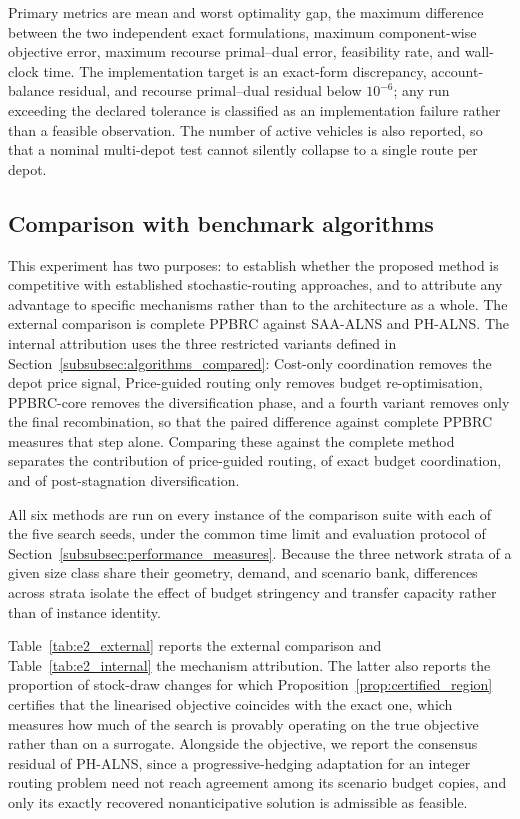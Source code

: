 \documentclass[authoryear,final,3p,times]{elsarticle}
\theoremstyle{definition}
\theoremstyle{plain}
\begin{document}
Primary metrics are mean and worst optimality gap, the maximum difference between the two independent exact formulations, maximum component-wise objective error, maximum recourse primal--dual error, feasibility rate, and wall-clock time. The implementation target is an exact-form discrepancy, account-balance residual, and recourse primal--dual residual below $10^{-6}$; any run exceeding the declared tolerance is classified as an implementation failure rather than a feasible observation.  The number of active vehicles is also reported, so that a nominal multi-depot test cannot silently collapse to a single route per depot.

\subsection{Comparison with benchmark algorithms}
\label{subsec:e2_algorithm}

This experiment has two purposes: to establish whether the proposed method is
competitive with established stochastic-routing approaches, and to attribute
any advantage to specific mechanisms rather than to the architecture as a
whole.  The external comparison is complete PPBRC against SAA-ALNS and
PH-ALNS.  The internal attribution uses the three restricted variants defined
in Section~\ref{subsubsec:algorithms_compared}: Cost-only coordination removes
the depot price signal, Price-guided routing only removes budget
re-optimisation, PPBRC-core removes the diversification phase, and a fourth
variant removes only the final recombination, so that the paired difference
against complete PPBRC measures that step alone.  Comparing
these against the complete method separates the contribution of price-guided
routing, of exact budget coordination, and of post-stagnation diversification.

All six methods are run on every instance of the comparison suite with each of
the five search seeds, under the common time limit and evaluation protocol of
Section~\ref{subsubsec:performance_measures}.  Because the three network
strata of a given size class share their geometry, demand, and scenario bank,
differences across strata isolate the effect of budget stringency and transfer
capacity rather than of instance identity.

Table~\ref{tab:e2_external} reports the external comparison and
Table~\ref{tab:e2_internal} the mechanism attribution. The latter also
reports the proportion of stock-draw changes for which
Proposition~\ref{prop:certified_region} certifies that the linearised
objective coincides with the exact one, which measures how much of the search
is provably operating on the true objective rather than on a surrogate.  Alongside the
objective, we report the consensus residual of PH-ALNS, since a
progressive-hedging adaptation for an integer routing problem need not reach
agreement among its scenario budget copies, and only its exactly recovered
nonanticipative solution is admissible as feasible.
\end{document}
